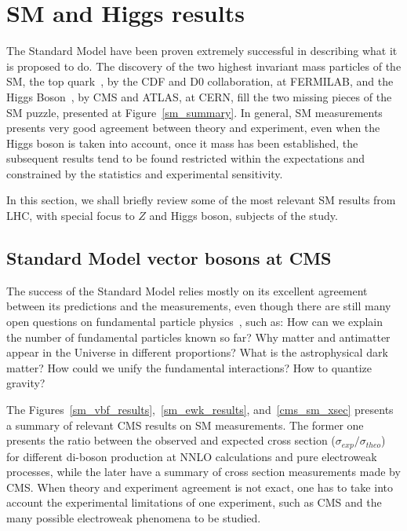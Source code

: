 \section{SM and Higgs results}
\label{section_sm_higgs_results}

The Standard Model have been proven extremely successful in describing what it is proposed to do. The discovery of the two highest invariant mass particles of the SM, the top quark~\cite{top_discovery_cdf,top_discovery_d0}, by the CDF and D0 collaboration, at FERMILAB, and the Higgs Boson~\cite{higgs_discovery_cms,higgs_discovery_atlas}, by CMS and ATLAS, at CERN, fill the two missing pieces of the SM puzzle, presented at Figure~\ref{sm_summary}. In general, SM measurements presents very good agreement between theory and experiment, even when the Higgs boson is taken into account, once it mass has been established, the subsequent results tend to be found restricted within the expectations and constrained by the statistics and experimental sensitivity.  

In this section, we shall briefly review some of the most relevant SM results from LHC, with special focus to $Z$ and Higgs boson, subjects of the study. 

\subsection{Standard Model vector bosons at CMS}
\label{section_sm_vb_results}

The success of the Standard Model relies mostly on its excellent agreement between its predictions and the measurements, even though there are still many open questions on fundamental particle physics~\cite{open_questions}, such as: How can we explain the number of fundamental particles known so far? Why matter and antimatter appear in the Universe in different proportions? What is the astrophysical dark matter? How could we unify the fundamental interactions? How to quantize gravity? 

The Figures~\ref{sm_vbf_results},~\ref{sm_ewk_results}, and~\ref{cms_sm_xsec} presents a summary of relevant CMS results on SM measurements. The former one presents the ratio between the observed and expected cross section ($\sigma_{exp}/\sigma_{theo}$) for different di-boson production at NNLO calculations and pure electroweak processes, while the later have a summary of cross section measurements made by CMS. When theory and experiment agreement is not exact, one has to take into account the experimental limitations of one experiment, such as CMS and the many possible electroweak phenomena to be studied.



